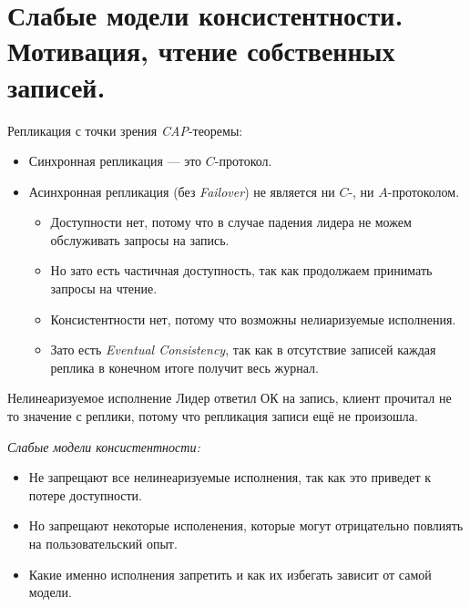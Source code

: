 \section{Слабые модели консистентности. Мотивация, чтение собственных записей.}

\begin{remark}
    Репликация с точки зрения \textit{CAP}-теоремы:
    \begin{itemize}
        \item Синхронная репликация --- это $C$-протокол.
        \item Асинхронная репликация (без \textit{Failover}) не является ни $C$-, ни $A$-протоколом.
        \begin{itemize}
            \item Доступности нет, потому что в случае падения лидера не можем обслуживать запросы на запись.
            \item Но зато есть частичная доступность, так как продолжаем принимать запросы на чтение.
            \item Консистентности нет, потому что возможны нелиаризуемые исполнения.
            \item Зато есть \textit{Eventual Consistency}, так как в отсутствие записей каждая реплика в конечном итоге получит весь журнал.
        \end{itemize}
    \end{itemize}
\end{remark}

\begin{example}{Нелинеаризуемое исполнение}
    Лидер ответил ОК на запись, клиент прочитал не то значение с реплики, потому что репликация записи ещё не произошла.
\end{example}

\begin{definition}
    \textit{Слабые модели консистентности:}
    \begin{itemize}
        \item Не запрещают все нелинеаризуемые исполнения, так как это приведет к потере доступности.
        \item Но запрещают некоторые исполенения, которые могут отрицательно повлиять на пользовательский опыт.
        \item Какие именно исполнения запретить и как их избегать зависит от самой модели.
    \end{itemize}

\end{definition}

